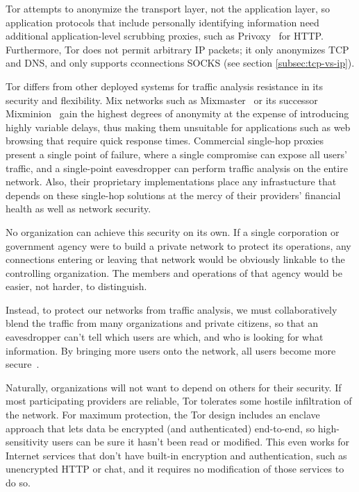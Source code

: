\documentclass{llncs}
\begin{document}
Tor attempts to anonymize the transport layer, not the application layer, so
application protocols that include personally identifying information need
additional application-level scrubbing proxies, such as
Privoxy~\cite{privoxy} for HTTP.  Furthermore, Tor does not permit arbitrary
IP packets; it only anonymizes TCP and DNS, and only supports cconnections
SOCKS (see section \ref{subsec:tcp-vs-ip}).

Tor differs from other deployed systems for traffic analysis resistance
in its security and flexibility.  Mix networks such as
Mixmaster~\cite{mixmaster-spec} or its successor Mixminion~\cite{minion-design}
gain the highest degrees of anonymity at the expense of introducing highly
variable delays, thus making them unsuitable for applications such as web
browsing that require quick response times.  Commercial single-hop
proxies~\cite{anonymizer} present a single point of failure, where
a single compromise can expose all users' traffic, and a single-point
eavesdropper can perform traffic analysis on the entire network.
Also, their proprietary implementations place any infrastucture that
depends on these single-hop solutions at the mercy of their providers'
financial health as well as network security.

No organization can achieve this security on its own.  If a single
corporation or government agency were to build a private network to
protect its operations, any connections entering or leaving that network
would be obviously linkable to the controlling organization.  The members
and operations of that agency would be easier, not harder, to distinguish.

Instead, to protect our networks from traffic analysis, we must
collaboratively blend the traffic from many organizations and private
citizens, so that an eavesdropper can't tell which users are which,
and who is looking for what information.  By bringing more users onto
the network, all users become more secure~\cite{econymics}.

Naturally, organizations will not want to depend on others for their
security.  If most participating providers are reliable, Tor tolerates
some hostile infiltration of the network.  For maximum protection,
the Tor design includes an enclave approach that lets data be encrypted
(and authenticated) end-to-end, so high-sensitivity users can be sure it
hasn't been read or modified.  This even works for Internet services that
don't have built-in encryption and authentication, such as unencrypted
HTTP or chat, and it requires no modification of those services to do so.
\end{document}
